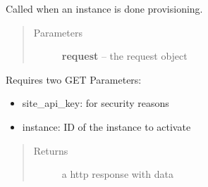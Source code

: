 \documentclass[letterpaper,10pt,english]{sphinxmanual}
\begin{document}
\begin{fulllineitems}
\label{api/cloud:limeade.cloud.views.api.instance_activate}
Called when an instance is done provisioning.
\begin{quote}\begin{description}
\item[{Parameters}] \leavevmode
\textbf{request} -- the request object

\end{description}\end{quote}

Requires two GET Parameters:
\begin{itemize}
\item {} 
site\_api\_key: for security reasons

\item {} 
instance: ID of the instance to activate

\end{itemize}
\begin{quote}\begin{description}
\item[{Returns}] \leavevmode
a http response with data

\end{description}\end{quote}

\end{fulllineitems}

\end{document}
